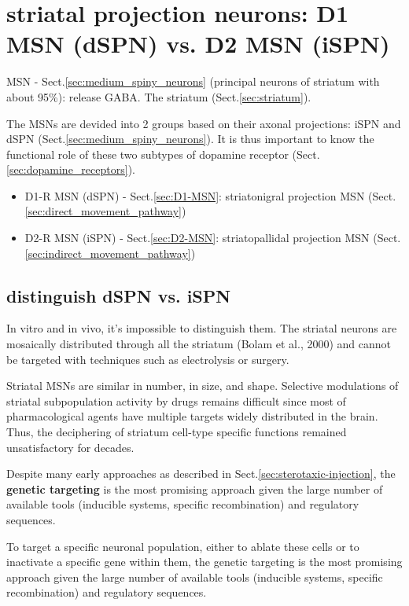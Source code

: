 \section{striatal projection neurons: D1 MSN (dSPN) vs. D2 MSN (iSPN)}
\label{sec:iSPN-vs-dSPN}
\label{sec:dSPN-vs-iSPN}


MSN - Sect.\ref{sec:medium_spiny_neurons} (principal neurons of striatum with
about 95\%):   release GABA. The striatum (Sect.\ref{sec:striatum}).

The MSNs are devided into 2 groups based on their axonal projections: iSPN and
dSPN (Sect.\ref{sec:medium_spiny_neurons}). It is thus important to know the
functional role of these two subtypes of dopamine receptor
(Sect.\ref{sec:dopamine_receptors}).
\begin{itemize}
  \item D1-R MSN (dSPN) - Sect.\ref{sec:D1-MSN}: striatonigral projection MSN
  (Sect.\ref{sec:direct_movement_pathway})
  
  \item D2-R MSN (iSPN) - Sect.\ref{sec:D2-MSN}: striatopallidal projection MSN 
  (Sect.\ref{sec:indirect_movement_pathway})
\end{itemize}

\subsection{distinguish dSPN vs. iSPN}
\label{sec:distinguish-dSPN-iSPN}

In vitro and in vivo, it's impossible to distinguish them.
The striatal neurons are mosaically distributed through all the striatum (Bolam
et al., 2000) and cannot be targeted with techniques such as electrolysis or
surgery.

Striatal MSNs are similar in number, in size, and shape.
Selective modulations of striatal subpopulation activity by drugs remains
difficult since most of pharmacological agents have multiple targets widely
distributed in the brain. Thus, the deciphering of striatum cell-type specific
functions remained unsatisfactory for decades.

Despite many early approaches as described in
Sect.\ref{sec:sterotaxic-injection}, the {\bf genetic targeting} is the most
promising approach given the large number of available tools (inducible systems,
specific recombination) and regulatory sequences.

To target a specific neuronal population, either to ablate these cells or to
inactivate a specific gene within them, the genetic targeting is the most
promising approach given the large number of available tools (inducible systems,
specific recombination) and regulatory sequences.

